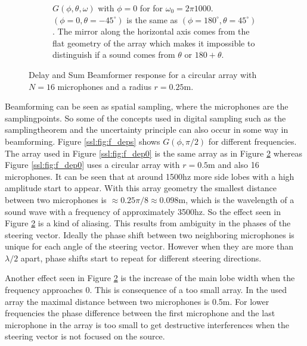 \begin{figure}[h]
\begin{subfigure}[t]{0.45\textwidth}
		\caption{\(G(\phi, \theta, \omega)\) with $\phi = 0$ for for $\omega_0 = 2\pi 1000$. 
		$(\phi= 0, \theta = -45^\circ)$ is the same as $(\phi= 180^\circ, \theta = 45^\circ)$.
		The mirror along the horizontal axis comes from the flat geometry of the array which makes
		it impossible to distinguish if a sound comes from $\theta$ or $180 + \theta$.} 
		\label{ssl:fig:CircBmTheta}
	\end{subfigure}
	\caption{Delay and Sum Beamformer response for a circular array with $N=16$ microphones 
	and a radius $r = 0.25$m. }
	\label{ssl:fig:CircBmResponse}
\end{figure}

Beamforming can be seen as spatial sampling, where the microphones
are the samplingpoints.
So some of the concepts used in digital sampling such as 
the samplingtheorem and the uncertainty principle can also 
occur in some way in beamforming.
Figure \ref{ssl:fig:f_deps} shows $G(\phi, \pi/2)$ for different frequencies.
The array used in Figure \ref{ssl:fig:f_dep0} is the same array
as in Figure \ref*{ssl:fig:CircBmResponse} whereas Figure \ref{ssl:fig:f_dep0}
uses a circular array with $r = 0.5$m and also 16 microphones. 
It can be seen that at around 1500hz more side lobes with a 
high amplitude start to appear. 
With this array geometry the smallest distance between two 
microphones is $\approx 0.25 \pi/8 \approx 0.098$m, which is the wavelength
of a sound wave with a frequency of approximately 3500hz.
So the effect seen in Figure \ref*{ssl:fig:CircBmResponse} is 
a kind of aliasing.
This results from ambiguity in the phases of the steering vector.
Ideally the phase shift between two neighboring microphones is unique
for each angle of the steering vector. 
However when they are more than $\lambda/2$ apart, phase shifts start to 
repeat for different steering directions.

Another effect seen in Figure \ref*{ssl:fig:CircBmResponse} is the increase
of the main lobe width when the frequency approaches 0.
This is consequence of a too small array. 
In the used array the maximal distance between two microphones is 0.5m.
For lower frequencies the phase difference between the first microphone and 
the last microphone in the array is too small to get destructive
interferences when the steering vector is not focused on the source.


